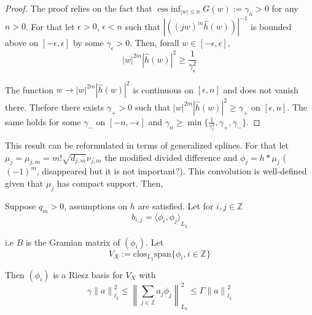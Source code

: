 \documentclass[a4paper, 11pt]{article}
\DeclareMathOperator*{\essinf}{ess\ inf}
\begin{document}
\begin{proof} The proof relies on the fact that $\essinf_{|w| \leq n} G(w) := \gamma_n > 0$ for any $n > 0$. For that 
  let $\epsilon > 0$, $\epsilon < n$ such that ${|\left({(jw)}^m\hat{h}(w)\right)|}^{-1}$ is bounded above on 
  $[-\epsilon, \epsilon]$ by some $\gamma_{\epsilon} > 0$. Then, forall $w \in [-\epsilon, \epsilon]$,
  \begin{equation*}
    {|w|}^{2m} |\hat{h}(w)|^2 \geq \frac{1}{\gamma_{\epsilon}^2}
  \end{equation*}

  The function $w \to   {|w|}^{2m} |\hat{h}(w)|^2$ is continuous on $[\epsilon, n]$ and does not vanish there. Thefore 
  there exists $\gamma_{+} > 0$ such that  ${|w|}^{2m} |\hat{h}(w)|^2 \geq \gamma_{+}$ on $[\epsilon, n]$. The same 
  holds for some $\gamma_{-}$ on $[-n, -\epsilon]$ and $\gamma_n \geq \min \{\frac{1}{\gamma_{\epsilon}^2}, \gamma_+, 
  \gamma_-\}$.
\end{proof}

This result can be reformulated in terms of generalized splines. For that let $\mu_j = \mu_{j,m} = m! \sqrt{d_{j,m}} 
\nu_{j,m}$ the modified divided difference and $\phi_j = h * \mu_j$ (${(-1)}^m$, disappeared but it is not important?).  
This convolution is well-defined given that $\mu_j$ has compact support. Then,

\begin{thm}{3}
  Suppose $q_m > 0$, assumptions on $h$ are satisfied. Let for $i,j \in \mathbb{Z}$
  \begin{equation*}
    b_{i,j} = {\langle \phi_i, \phi_j \rangle}_{L_2}
  \end{equation*}

  i.e $B$ is the Gramian matrix of $(\phi_i)$. Let
  \begin{equation*}
    V_X := \text{clos}_{L_2} \text{span} \{\phi_i, i \in \mathbb{Z}\}
  \end{equation*}
  
  Then $(\phi_i)$ is a Riesz basis for $V_X$ with
  \begin{equation}
    \gamma {\|a\|}_{l_2}^2 \leq {\left\| \sum_{j \in \mathbb{Z}} a_j \phi_j \right\|}_{L_2}^2 \leq \Gamma 
    {\|a\|}_{l_2}^2
  \end{equation}
\end{thm}
\end{document}
